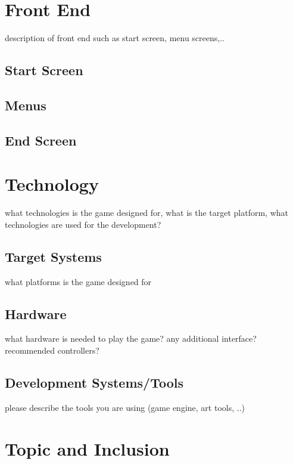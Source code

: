 \documentclass[a4paper]{scrreprt}
\begin{document}


\chapter{Front End}
description of front end such as start screen, menu screens,..  

\section{Start Screen}

\section{Menus}

\section{End Screen}



\chapter{Technology}
what technologies is the game designed for, what is the target platform, what technologies are used for the development? 

\section{Target Systems}
what platforms is the game designed for

\section{Hardware}
what hardware is needed to play the game? any additional interface? recommended controllers? 

\section{Development Systems/Tools}
please describe the tools you are using (game engine, art tools, ..) 



\chapter{Topic and Inclusion }
\end{document}
